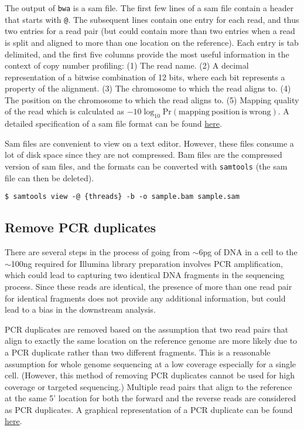 \documentclass[11pt]{article}
\newcommand{\prog}[1]{\texttt{#1}}
\begin{document}
The output of \prog{bwa} is a sam file. The first few lines of a sam
file contain a header that starts with \texttt{@}. The subsequent
lines contain one entry for each read, and thus two entries for a read
pair (but could contain more than two entries when a read is split and
aligned to more than one location on the reference).
%
Each entry is tab delimited, and the first five columns provide the
most useful information in the context of copy number profiling: (1) The
read name. (2) A decimal representation of a bitwise combination of 12
bits, where each bit represents a property of the alignment. (3) The
chromosome to which the read aligns to. (4) The position on the
chromosome to which the read aligns to. (5) Mapping quality of the read
which is calculated as $-10 \log_{10} \mathrm{Pr(mapping\ position\ is
\ wrong)}$.
%
A detailed specification of a sam file format can be found
\href{https://samtools.github.io/hts-specs/SAMv1.pdf}{here}.

Sam files are convenient to view on a text editor. However, these files
consume a lot of disk space since they are not compressed. Bam files are
the compressed version of sam files, and the formats can be converted
with \prog{samtools} (the sam file can then be deleted).
\begin{verbatim}
$ samtools view -@ {threads} -b -o sample.bam sample.sam
\end{verbatim}

\subsection{Remove PCR duplicates}
There are several steps in the process of going from
$\sim$6\si{\pico\gram} of DNA in a cell to the $\sim$100\si{\nano\gram}
required for Illumina library preparation involves PCR amplification,
which could lead to capturing two identical DNA fragments in the
sequencing process.  Since these reads are identical, the presence of
more than one read pair for identical fragments does not provide any
additional information, but could lead to a bias in the downstream
analysis.

PCR duplicates are removed based on the assumption that two read pairs
that align to exactly the same location on the reference genome are more
likely due to a PCR duplicate rather than two different fragments. This
is a reasonable assumption for whole genome sequencing at a low coverage
especially for a single cell. (However, this method of removing PCR
duplicates cannot be used for high coverage or targeted sequencing.)
Multiple read pairs that align to the reference at the same 5' location
for both the forward and the reverse reads are considered as PCR
duplicates. A graphical representation of a PCR duplicate can be found
\href{https://www.htslib.org/algorithms/duplicate.html}{here}.
\end{document}
